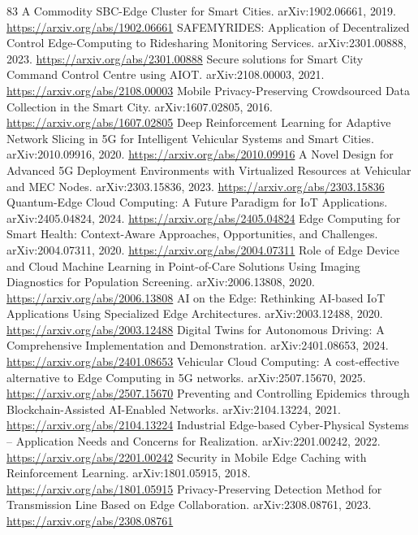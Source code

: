 \documentclass[11pt]{article}
\begin{document}
\begin{thebibliography}{83}
 A Commodity SBC-Edge Cluster for Smart Cities. arXiv:1902.06661, 2019. \url{https://arxiv.org/abs/1902.06661}
 SAFEMYRIDES: Application of Decentralized Control Edge-Computing to Ridesharing Monitoring Services. arXiv:2301.00888, 2023. \url{https://arxiv.org/abs/2301.00888}
 Secure solutions for Smart City Command Control Centre using AIOT. arXiv:2108.00003, 2021. \url{https://arxiv.org/abs/2108.00003}
 Mobile Privacy-Preserving Crowdsourced Data Collection in the Smart City. arXiv:1607.02805, 2016. \url{https://arxiv.org/abs/1607.02805}
 Deep Reinforcement Learning for Adaptive Network Slicing in 5G for Intelligent Vehicular Systems and Smart Cities. arXiv:2010.09916, 2020. \url{https://arxiv.org/abs/2010.09916}
 A Novel Design for Advanced 5G Deployment Environments with Virtualized Resources at Vehicular and MEC Nodes. arXiv:2303.15836, 2023. \url{https://arxiv.org/abs/2303.15836}
 Quantum-Edge Cloud Computing: A Future Paradigm for IoT Applications. arXiv:2405.04824, 2024. \url{https://arxiv.org/abs/2405.04824}
 Edge Computing for Smart Health: Context-Aware Approaches, Opportunities, and Challenges. arXiv:2004.07311, 2020. \url{https://arxiv.org/abs/2004.07311}
 Role of Edge Device and Cloud Machine Learning in Point-of-Care Solutions Using Imaging Diagnostics for Population Screening. arXiv:2006.13808, 2020. \url{https://arxiv.org/abs/2006.13808}
 AI on the Edge: Rethinking AI-based IoT Applications Using Specialized Edge Architectures. arXiv:2003.12488, 2020. \url{https://arxiv.org/abs/2003.12488}
 Digital Twins for Autonomous Driving: A Comprehensive Implementation and Demonstration. arXiv:2401.08653, 2024. \url{https://arxiv.org/abs/2401.08653}
 Vehicular Cloud Computing: A cost-effective alternative to Edge Computing in 5G networks. arXiv:2507.15670, 2025. \url{https://arxiv.org/abs/2507.15670}
 Preventing and Controlling Epidemics through Blockchain-Assisted AI-Enabled Networks. arXiv:2104.13224, 2021. \url{https://arxiv.org/abs/2104.13224}
 Industrial Edge-based Cyber-Physical Systems -- Application Needs and Concerns for Realization. arXiv:2201.00242, 2022. \url{https://arxiv.org/abs/2201.00242}
 Security in Mobile Edge Caching with Reinforcement Learning. arXiv:1801.05915, 2018. \url{https://arxiv.org/abs/1801.05915}
 Privacy-Preserving Detection Method for Transmission Line Based on Edge Collaboration. arXiv:2308.08761, 2023. \url{https://arxiv.org/abs/2308.08761}

\end{thebibliography}
\end{document}
